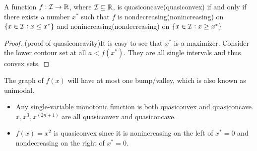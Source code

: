 \begin{refsection}
\begin{definition}
\begin{itemize}
	\end{itemize}
\end{definition}

\begin{lemma}
	A function $f:\mathcal{I} \to \mathbb{R}$, where $\mathcal{I} \subseteq \mathbb{R}$, is quasiconcave(quasiconvex) if and only if there exists a number $x^*$ such that $f$ is nondecreasing(nonincreasing) on $\{x\in \mathcal{I}: x\leq x^* \}$ and nonincreasing(nondecreasing) on $\{x\in \mathcal{I}: x\geq x^* \}$  
\end{lemma}
\begin{proof}
	(proof of quasiconcavity)It is easy to see that $x^*$ is a maximizer. Consider the lower contour set at all $a < f(x^*)$. They are all single intervals and thus convex sets.  
\end{proof}

\begin{remark}
	The graph of $f(x)$ will have at most one bump/valley, which is also known as unimodal.
\end{remark}

\begin{example}\hfill
	\begin{itemize}
		\item Any single-variable monotonic function is both quasiconvex and quasiconcave. $x, x^3, x^(2n+1)$ are all quasiconvex and quasiconcave.
		\item $f(x) = x^2$ is quasiconvex since it is nonincreasing on the left of $x^* = 0$ and nondecreasing on the right of $x^* = 0$.
	\end{itemize}
\end{example}



\end{refsection}
